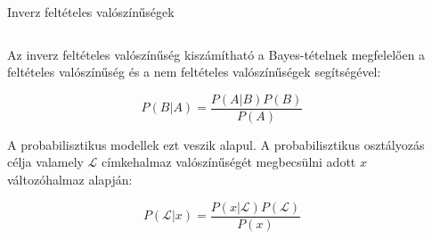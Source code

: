 \documentclass[english, aspectratio=169]{beamer}
\begin{document}
\begin{frame}{Inverz feltételes valószínűségek}
\begin{columns}
\begin{column}{.5\textwidth}
Az inverz feltételes valószínűség kiszámítható a Bayes-tételnek megfelelően a feltételes valószínűség és a nem feltételes valószínűségek segítségével:
\begin{block}{}
\[
P\left( B \vert A \right) = \frac{P\left( A \vert B \right) P\left( B \right)}{P\left( A \right)}
\]
\end{block}
A probabilisztikus modellek ezt veszik alapul. A probabilisztikus osztályozás célja valamely $\mathcal{L}$ címkehalmaz valószínűségét megbecsülni adott $x$ változóhalmaz alapján:
\begin{block}{}
\[
P\left( \mathcal{L} \vert x \right) = \frac{P\left( x \vert \mathcal{L} \right)P\left( \mathcal{L} \right)}{P\left( x \right)}
\]
\end{block}
\end{column}
\begin{column}{.5\textwidth}

\end{column}
\end{columns}
\end{frame}
\end{document}
